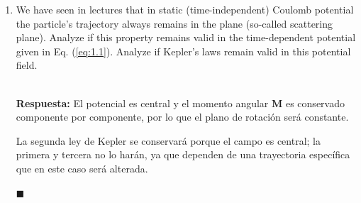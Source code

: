 \documentclass[]{article}
\numberwithin{equation}{section}
\newcommand{\0}{\textcolor{gray}{0}}
\newcommand{\n}[1]{\mathbf{#1}}
\newcommand{\qed}{\hfill\(\blacksquare\)}
\newcommand{\resp}{
	\\
	
	\textbf{Respuesta:} }
\begin{document}
\begin{enumerate}
	\item[(c)] We have seen in lectures that in static (time-independent) Coulomb potential the particle's trajectory always remains in the plane (so-called scattering plane). Analyze if this property remains valid in the time-dependent potential given in Eq. (\ref{eq:1.1}). Analyze if Kepler’s laws remain valid in this potential field.
	\resp El potencial es central y el momento angular $\n{M}$ es conservado componente por componente, por lo que el plano de rotación será constante.
	
	La segunda ley de Kepler se conservará porque el campo es central; la primera y tercera no lo harán, ya que dependen de una trayectoria específica que en este caso será alterada.
	
	\qed
	
\end{enumerate}
\end{document}
